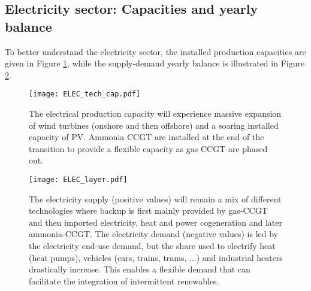 \subsection{Electricity sector: Capacities and yearly balance}
\label{subsubsec:elec_sector}
To better understand the electricity sector, the installed production capacities are given in Figure \ref{fig:ELEC_tech_cap}, while the supply-demand yearly balance is illustrated in Figure \ref{fig:ELEC_layer}.

\begin{figure}[!htbp]
     \centering
         \texttt{[image: ELEC\_tech\_cap.pdf]}
         \caption{The electrical production capacity will experience  massive expansion of wind turbines (onshore and then offshore) and a soaring installed capacity of \gls{PV}. Ammonia \gls{CCGT} are installed at the end of the transition to provide a flexible capacity as gas \gls{CCGT} are phased out.}
         \label{fig:ELEC_tech_cap}
\end{figure}


\begin{figure}[!htbp]
     \centering
         \texttt{[image: ELEC\_layer.pdf]}
         \caption{The electricity supply (positive values) will remain a mix of different technologies where backup is first mainly provided by gas-\gls{CCGT} and then imported electricity, heat and power cogeneration and later ammonia-\gls{CCGT}. The electricity demand (negative values) is led by the electricity end-use demand, but the share used to electrify heat (heat pumps), vehicles (cars, trains, trams, ...) and industrial heaters drastically increase. This enables a flexible demand that can facilitate the integration of intermittent renewables.}
         \label{fig:ELEC_layer}
\end{figure}

